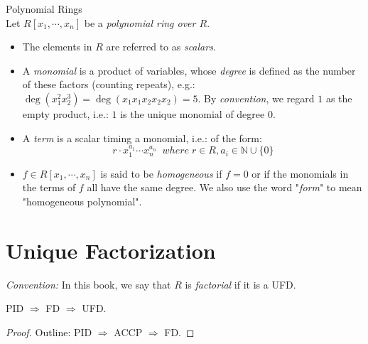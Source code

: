 \begin{definition}{Polynomial Rings}\\
Let $R[x_1,\cdots,x_n]$ be a \textit{polynomial ring over $R$}.
\begin{itemize}
    \item The elements in $R$ are referred to as \textit{scalars}.
    \item A \textit{monomial} is a product of variables, whose \textit{degree} is defined as the number of these factors (counting repeats), e.g.: $\deg (x_1^2x_2^3) = \deg (x_1x_1x_2x_2x_2) =5$. By \textit{convention}, we regard $1$ as the empty product, i.e.: $1$ is the unique monomial of degree $0$.

    \item A \textit{term} is a scalar timing a monomial, i.e.: of the form:
    $$r \cdot x_1 ^{a_1} \cdots x_n^{a_n} \;\;where\;r\in R, a_i \in \mathbb{N} \cup \{0\}$$
    \item $f\in R[x_1,\cdots ,x_n]$ is said to be \textit{homogeneous} if $f=0$ or if the monomials in the terms of $f$ all have the same degree. We also use the word "\textit{form}" to mean "homogeneous polynomial".
\end{itemize}
\end{definition}

\section{Unique Factorization}

\noindent\textit{Convention:} In this book, we say that $R$ is \textit{factorial} if it is a UFD.

\begin{theorem}
    PID $\Rightarrow$ FD $\Rightarrow$ UFD.
\end{theorem}

\begin{proof}
    Outline: PID $\Rightarrow$ ACCP $\Rightarrow$ FD.
\end{proof}


